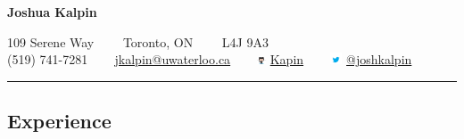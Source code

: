 \documentclass[10pt,letterpaper]{article}
\begin{document}
\begin{center}
{\LARGE \textbf{Joshua Kalpin}}

109 Serene Way\ \ \textbullet
\ \ Toronto, ON\ \ \textbullet
\ \ L4J 9A3
\\
\Mobilefone (519) 741-7281 \ \textbullet
\ \ \Letter \href{mailto:jkalpin@uwaterloo.ca}{jkalpin@uwaterloo.ca} \ \textbullet
\ \ \includegraphics[height=6pt]{Octocat} 
\href{https://github.com/kapin}{Kapin} \ \textbullet
\ \ \includegraphics[height=10pt]{twitter} 
\href{https://twitter.com/joshkalpin}{@joshkalpin}
\end{center}

\hrule
\vspace{-0.4em}
\subsection*{Experience}
\end{document}

